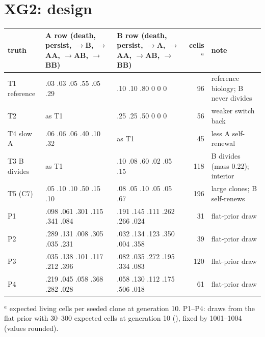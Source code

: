 \documentclass[10pt,a4paper]{article}
\begin{document}
\section{XG2: design}\label{sec:xg2design}
\begin{center}\footnotesize\setlength{\tabcolsep}{3pt}
\begin{tabularx}{\linewidth}{@{}lP{4.4cm}P{4.6cm}rY@{}}\toprule
truth & A row (death, persist, $\to$B, $\to$AA, $\to$AB, $\to$BB) & B row (death, persist, $\to$A, $\to$AA, $\to$AB, $\to$BB) & cells$^a$ & note \\\midrule
T1 reference & .03 .03 .05 .55 .05 .29 & .10 .10 .80 0 0 0 & 96 & reference biology; B never divides \\
T2 & as T1 & .25 .25 .50 0 0 0 & 56 & weaker switch back \\
T4 slow A & .06 .06 .06 .40 .10 .32 & as T1 & 45 & less A self-renewal \\
T3 B divides & as T1 & .10 .08 .60 .02 .05 .15 & 118 & B divides (mass 0.22); interior \\
T5 (C7) & .05 .10 .10 .50 .15 .10 & .08 .05 .10 .05 .05 .67 & 196 & large clones; B self-renews \\
P1 & .098 .061 .301 .115 .341 .084 & .191 .145 .111 .262 .266 .024 & 31 & flat-prior draw \\
P2 & .289 .131 .008 .305 .035 .231 & .032 .134 .123 .350 .004 .358 & 39 & flat-prior draw \\
P3 & .035 .138 .101 .117 .212 .396 & .082 .035 .272 .195 .334 .083 & 120 & flat-prior draw \\
P4 & .219 .045 .058 .368 .282 .028 & .058 .130 .112 .175 .506 .018 & 61 & flat-prior draw \\\bottomrule
\end{tabularx}

$^a$ expected living cells per seeded clone at generation 10. P1--P4: draws from the flat prior with 30--300 expected cells at generation 10 (), fixed by  1001--1004 (values rounded).
\end{center}
\end{document}
